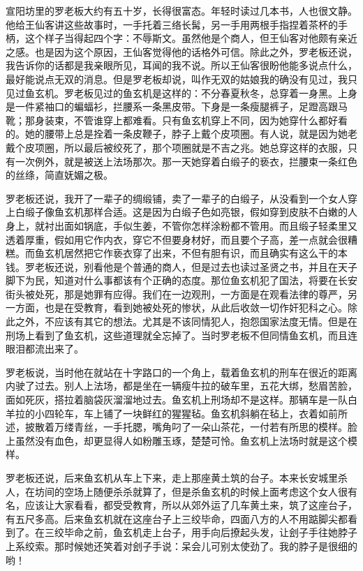 宣阳坊里的罗老板大约有五十岁，长得很富态。年轻时读过几本书，人也很文静。他给王仙客讲这些故事时，一手托着三络长髯，另一手用两根手指捏着茶杯的手柄，这个样子当得起四个字：不辱斯文。虽然他是个商人，但王仙客对他颇有亲近之感。也是因为这个原因，王仙客觉得他的话格外可信。除此之外，罗老板还说，我告诉你的话都是我亲眼所见，耳闻的我不说。所以王仙客很盼他能多说点什么，最好能说点无双的消息。但是罗老板却说，叫作无双的姑娘我的确没有见过，我只见过鱼玄机。罗老板见过的鱼玄机是这样的：不分春夏秋冬，总穿着一身黑。上身是一件紧袖口的蝙蝠衫，拦腰系一条黑皮带。下身是一条瘦腿裤子，足蹬高跟马靴；那身装束，不管谁穿上都难看。只有鱼玄机穿上不同，因为她穿什么都好看的。她的腰带上总是拴着一条皮鞭子，脖子上戴个皮项圈。有人说，就是因为她老戴个皮项圈，所以最后被绞死了，那个项圈就是不吉之兆。她总穿这样的衣服，只有一次例外，就是被送上法场那次。那一天她穿着白缎子的亵衣，拦腰束一条红色的丝绦，简直妩媚之极。 

罗老板还说，我开了一辈子的绸缎铺，卖了一辈子的白缎子，从没看到一个女人穿上白缎子像鱼玄机那样合适。这是因为白缎子色如亮银，假如穿到皮肤不白嫩的人身上，就衬出面如锅底，手似生姜，不管你怎样涂粉都不管用。而且缎子轻柔里又透着厚重，假如用它作内衣，穿它不但要身材好，而且要个子高，差一点就会很糟糕。而鱼玄机居然把它作亵衣穿了出来，不但有胆有识，而且确实有这么干的本钱。罗老板还说，别看他是个普通的商人，但是过去也读过圣贤之书，并且在天子脚下为民，知道对什么事都该有个正确的态度。那位鱼玄机犯了国法，将要在长安街头被处死，那是她罪有应得。我们在一边观刑，一方面是在观看法律的尊严，另一方面，也是在受教育，看到她被处死的惨状，从此后收敛一切作奸犯科之心。除此之外，不应该有其它的想法。尤其是不该同情犯人，抱怨国家法度无情。但是在刑场上看到了鱼玄机，这些道理就全忘掉了。当时罗老板不但同情鱼玄机，而且连眼泪都流出来了。 

罗老板说，当时他在就站在十字路口的一个角上，载着鱼玄机的刑车在很近的距离内驶了过去。别人上法场，都是坐在一辆瘦牛拉的破车里，五花大绑，愁眉苦脸，面如死灰，搭拉着脑袋灰溜溜地过去。鱼玄机上刑场却不是这样。那辆车是一队白羊拉的小四轮车，车上铺了一块鲜红的猩猩毡。鱼玄机斜躺在毡上，衣着如前所述，披散着万缕青丝，一手托腮，嘴角叼了一朵山茶花，一付若有所思的模样。脸上虽然没有血色，却更显得人如粉雕玉琢，楚楚可怜。鱼玄机上法场时就是这个模样。 

罗老板还说，后来鱼玄机从车上下来，走上那座黄土筑的台子。本来长安城里杀人，在坊间的空场上随便杀杀就算了，但是杀鱼玄机的时候上面考虑这个女人很有名，应该让大家看看，都受受教育，所以从郊外运了几车黄土来，筑了这座台子，有五尺多高。后来鱼玄机就在这座台子上三绞毕命，四面八方的人不用踮脚尖都看到了。在三绞毕命之前，鱼玄机走上台子，用手向后撩起头发，让刽子手往她脖子上系绞索。那时候她还笑着对刽子手说：呆会儿可别太使劲了。我的脖子是很细的哟！ 

